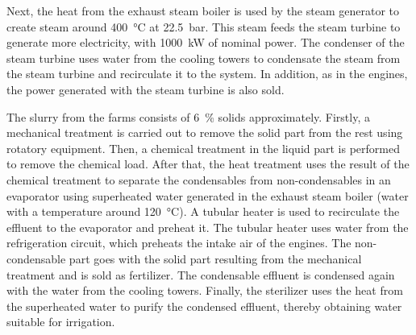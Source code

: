 Next, the heat from the exhaust steam boiler is used by the steam generator to create steam around \SI{400}{\celsius} at \SI{22.5}{bar}. This steam feeds the steam turbine to generate more electricity, with \SI{1000}{kW} of nominal power. The condenser of the steam turbine uses water from the cooling towers to condensate the steam from the steam turbine and recirculate it to the system. In addition, as in the engines, the power generated with the steam turbine is also sold. 

The slurry from the farms consists of \SI{6}{\percent} solids approximately. Firstly, a mechanical treatment is carried out to remove the solid part from the rest using rotatory equipment. Then, a chemical treatment in the liquid part is performed to remove the chemical load. After that, the heat treatment uses the result of the chemical treatment to separate the condensables from non-condensables in an evaporator using superheated water generated in the exhaust steam boiler (water with a temperature around \SI{120}{\celsius}). A tubular heater is used to recirculate the effluent to the evaporator and preheat it. The tubular heater uses water from the refrigeration circuit, which preheats the intake air of the engines. The non-condensable part goes with the solid part resulting from the mechanical treatment and is sold as fertilizer. The condensable effluent is condensed again with the water from the cooling towers. Finally, the sterilizer uses the heat from the superheated water to purify the condensed effluent, thereby obtaining water suitable for irrigation. 
